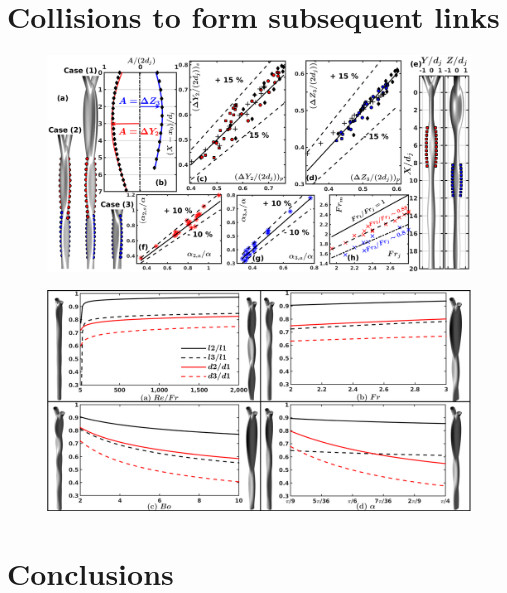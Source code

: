 \documentclass[%
aip,
sd,%
amsmath,amssymb,
preprint,%
author-year,%
]{revtex4-1}
\begin{document}
\section{Collisions to form subsequent links}
\begin{figure}
	\centering
	\includegraphics[width=\linewidth]{secondCollision}
	\caption{}
	\label{Figure::secondCollision}
\end{figure}
\begin{figure}
	\centering
	\includegraphics[width=\linewidth]{lil1did1}
	\caption{}
	\label{Figure::lil1}
\end{figure}
\section{Conclusions}
\cleardoublepage

\end{document}
